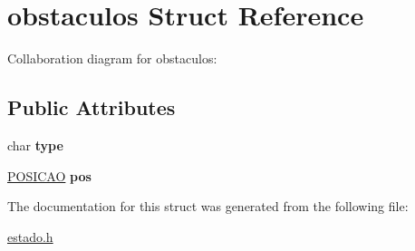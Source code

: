\hypertarget{structobstaculos}{}\section{obstaculos Struct Reference}
\label{structobstaculos}


Collaboration diagram for obstaculos\+:
\subsection*{Public Attributes}
\begin{DoxyCompactItemize}
\item 
char {\bfseries type}\hypertarget{structobstaculos_a6bca0f05221c6f5e8d6f2dfbbebb8af4}{}\label{structobstaculos_a6bca0f05221c6f5e8d6f2dfbbebb8af4}

\item 
\hyperlink{estado_8h_a55b3f4b56938eeb8fa5e8f9c07baf1b0}{P\+O\+S\+I\+C\+AO} {\bfseries pos}\hypertarget{structobstaculos_a477f499cd94ddd619b97363894f2bb6c}{}\label{structobstaculos_a477f499cd94ddd619b97363894f2bb6c}

\end{DoxyCompactItemize}


The documentation for this struct was generated from the following file\+:\begin{DoxyCompactItemize}
\item 
\hyperlink{estado_8h}{estado.\+h}\end{DoxyCompactItemize}
